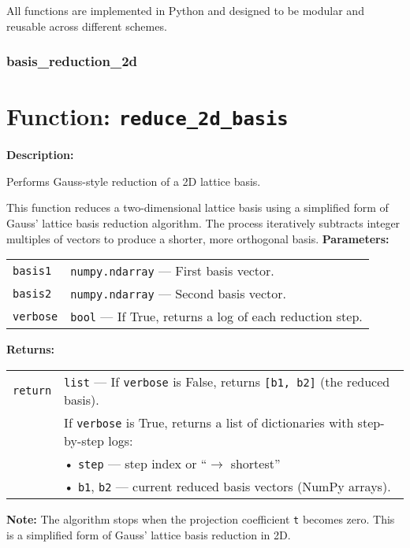 \documentclass[a4paper,12pt]{article}
\begin{document}
All functions are implemented in Python and designed to be modular and reusable across different schemes.
\subsubsection{basis\_reduction\_2d}

\section*{Function: \texttt{reduce\_2d\_basis}}

\textbf{Description:}

Performs Gauss-style reduction of a 2D lattice basis.

This function reduces a two-dimensional lattice basis using a simplified form
of Gauss' lattice basis reduction algorithm. The process iteratively subtracts
integer multiples of vectors to produce a shorter, more orthogonal basis.
\vspace{1em}
\noindent
\textbf{Parameters:}

\vspace{0.5em}
\begin{tabular}{p{3cm} p{11cm}}
\texttt{basis1} & \texttt{numpy.ndarray} — First basis vector. \\
\texttt{basis2} & \texttt{numpy.ndarray} — Second basis vector. \\
\texttt{verbose} & \texttt{bool} — If True, returns a log of each reduction step. \\
\end{tabular}

\vspace{1em}
\noindent
\textbf{Returns:}

\vspace{0.5em}
\begin{tabular}{p{3cm} p{11cm}}
\texttt{return} & \texttt{list} — If \texttt{verbose} is False, returns \texttt{[b1, b2]} (the reduced basis).\\
                & If \texttt{verbose} is True, returns a list of dictionaries with step-by-step logs:\\
                & \quad • \texttt{step} — step index or ``$\rightarrow$ shortest''\\
                & \quad • \texttt{b1}, \texttt{b2} — current reduced basis vectors (NumPy arrays).\\
\end{tabular}

\vspace{1em}
\noindent
\textbf{Note:}  
The algorithm stops when the projection coefficient \texttt{t} becomes zero.  
This is a simplified form of Gauss’ lattice basis reduction in 2D.
\end{document}
